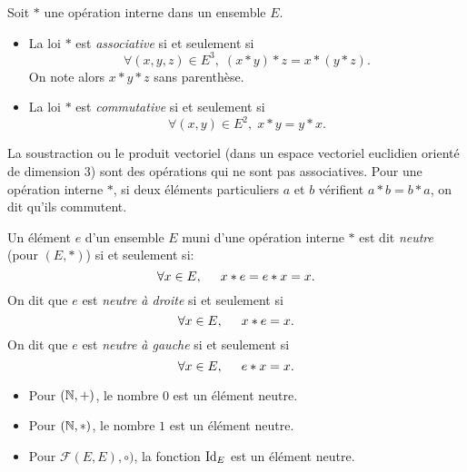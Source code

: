 \begin{defi}
Soit $*$ une opération interne dans un ensemble $E$.
\begin{itemize}
  \item La loi $*$ est \emph{associative} si et seulement si
\begin{displaymath}
  \forall(x,y,z) \in E^3,\;(x*y)*z = x*(y*z) .
\end{displaymath}
On note alors $x*y*z$ sans parenthèse.
\item La loi $*$ est \emph{commutative} si et seulement si
\begin{displaymath}
  \forall(x,y) \in E^2,\;x*y = y*x .
\end{displaymath}
\end{itemize}
\end{defi}
\begin{rem}
  La soustraction ou le produit vectoriel (dans un espace vectoriel euclidien orienté de dimension $3$) sont des opérations qui ne sont pas associatives. Pour une opération interne $*$, si deux éléments particuliers $a$ et $b$ vérifient $a*b=b*a$, on dit qu'ils commutent.
\end{rem}
\begin{defi}
Un élément $e$ d'un ensemble $E$ muni d'une opération interne $*$ est dit \emph{neutre} (pour $(E,*)$) si et seulement si:
\begin{displaymath}
  \forall x \in E,\hspace{0.5cm} x*e = e*x = x .
\end{displaymath}
On dit que $e$ est \emph{neutre à droite} si et seulement si 
\begin{displaymath}
  \forall x \in E,\hspace{0.5cm} x*e = x.
\end{displaymath}
On dit que $e$ est \emph{neutre à gauche} si et seulement si 
\begin{displaymath}
  \forall x \in E,\hspace{0.5cm} e*x = x.
\end{displaymath}
\end{defi}
\begin{exples}
\begin{itemize}
  \item Pour $(\mathbb{N}, +)$, le nombre $0$ est un élément neutre.
  \item Pour $(\mathbb{N}, *)$, le nombre $1$ est un élément neutre.
  \item Pour $\mathcal{F}(E,E),\circ)$, la fonction $\mathop{\mathrm{Id}}_E$ est un élément neutre.
\end{itemize}
\end{exples}

